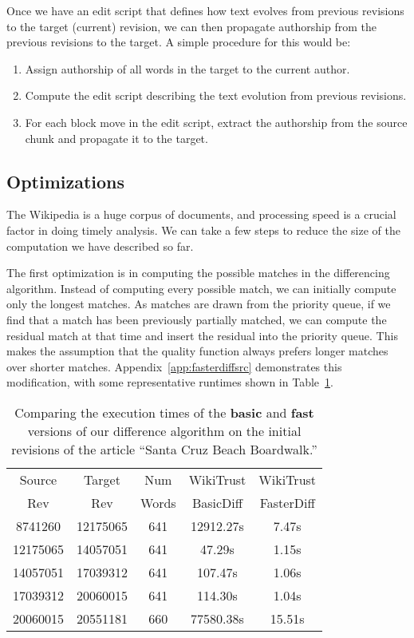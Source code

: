 Once we have an edit script that defines how text evolves from
previous revisions to the target (current) revision, we can then propagate
authorship from the previous revisions to the target.
A simple procedure for this would be:
\begin{enumerate}
\item Assign authorship of all words in the target to the current author.
\item Compute the edit script describing the text evolution from
    previous revisions.
\item For each block move in the edit script, extract the authorship
    from the source chunk and propagate it to the target.
\end{enumerate}

\subsection{Optimizations}

The Wikipedia is a huge corpus of documents, and processing speed
is a crucial factor in doing timely analysis.
We can take a few steps to reduce the size of the computation
we have described so far.

The first optimization is in computing the possible
matches in the differencing algorithm.
Instead of computing every possible match, we can initially compute
only the longest matches.
As matches are drawn from the priority queue, if we find
that a match has been previously partially matched, we can
compute the residual match at that time and insert the residual
into the priority queue.
This makes the assumption that the quality function always
prefers longer matches over shorter matches.
Appendix~\ref{app:fasterdiffsrc} demonstrates this
modification, with some representative runtimes shown
in Table~\ref{tab:comparediff}.


\begin{table}
\begin{center}
\begin{tabular}{| c | c || c || c | c |}
\hline
Source & Target & Num & WikiTrust & WikiTrust \\
Rev & Rev & Words & BasicDiff & FasterDiff \\
\hline
8741260 & 12175065 & 641 & 12912.27s & 7.47s \\
12175065 & 14057051 & 641 & 47.29s & 1.15s \\
14057051 & 17039312 & 641 & 107.47s & 1.06s \\
17039312 & 20060015 & 641 & 114.30s & 1.04s \\
20060015 & 20551181 & 660 & 77580.38s & 15.51s \\
\hline
\end{tabular}
\end{center}
\caption{Comparing the execution times of the \textbf{basic}
    and \textbf{fast} versions of our difference algorithm
    on the initial revisions of the article ``Santa Cruz Beach Boardwalk.''}
\label{tab:comparediff}
\end{table}



